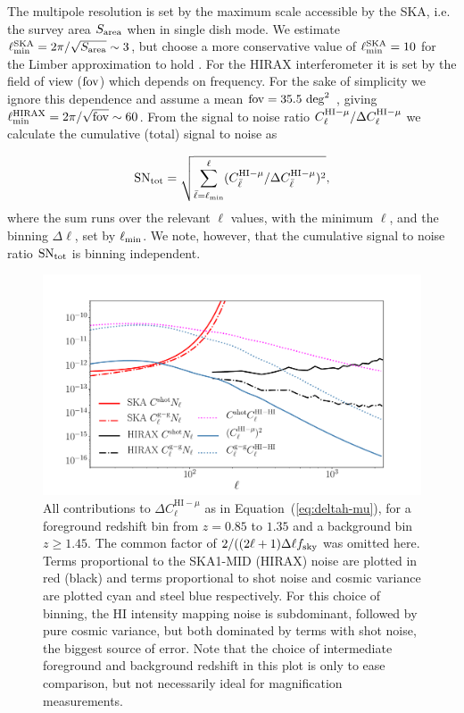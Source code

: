 \documentclass[useAMS,usenatbib]{mnras}
\newcommand{\be}{\begin{equation}}
\newcommand{\ee}{\end{equation}}
\begin{document}
The multipole resolution is set by the maximum scale accessible by the SKA, i.e. the survey area $S_{\rm area}$ when in single dish mode. We estimate $\ell_{\rm min}^{\rm SKA} = 2\pi/\sqrt{S_{\rm area}} \sim 3$, but choose a more conservative value of $\ell_{\rm min}^{\rm SKA} = 10$ for the Limber approximation to hold \citep{2008PhRvD..78l3506L}. For the HIRAX interferometer it is set by the field of view ($\rm fov$) which depends on frequency. For the sake of simplicity we ignore this dependence and assume a mean ${\rm fov} = 35.5 {\rm~deg}^2$ \citep{2016SPIE.9906E..5XN}, giving $\ell_{\rm min}^{\rm HIRAX} = 2\pi/\sqrt{\rm fov} \sim 60$. From the signal to noise ratio $C_\ell^{{\rm HI} - \mu} / \Delta C^{{\rm HI} - \mu}_\ell$ we calculate the cumulative (total) signal to noise as

\be
{\rm SN}_{\rm tot} = \sqrt{\sum_{\bar{\ell}=\ell_{\rm min}}^\ell (C_{\bar{\ell}}^{{\rm HI} - \mu} / \Delta C^{{\rm HI} - \mu}_{\bar{\ell}})^2},
\label{eq:s2ncum}
\ee
where the sum runs over the relevant $\ell$ values, with the minimum $\ell$, and the binning $\Delta \ell$, set by $\ell_{\rm min}$. We note, however, that the cumulative signal to noise ratio ${\rm SN}_{\rm tot}$ is binning independent.


\begin{figure}

\centering\includegraphics[width=.99\columnwidth]{X_error_contributions.pdf}
\captionsetup{width=.9\linewidth}

\caption{All contributions to $\Delta C_\ell^{\mathrm{HI-}\mu}$ as in Equation~(\ref{eq:deltah-mu}), for a foreground redshift bin from $z=0.85$ to $1.35$ and a background bin $z\geq1.45$. The common factor of $2/((2\ell+1)\Delta\ell f_{\rm sky}$ was omitted here. Terms proportional to the SKA1-MID (HIRAX) noise are plotted in red (black) and terms proportional to shot noise and cosmic variance are plotted cyan and steel blue respectively. For this choice of binning, the HI intensity mapping noise is subdominant, followed by pure cosmic variance, but both dominated by terms with shot noise, the biggest source of error. Note that the choice of intermediate foreground and background redshift in this plot is only to ease comparison, but not necessarily ideal for magnification measurements.}
\label{fig:x_error_contributions}
\end{figure}
\end{document}
